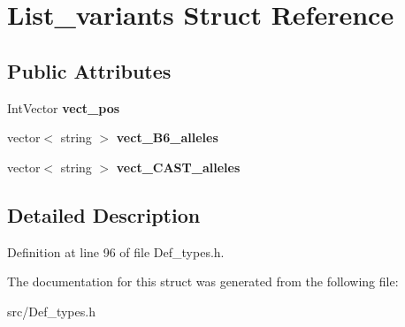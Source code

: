 \hypertarget{struct_list__variants}{}\section{List\+\_\+variants Struct Reference}
\label{struct_list__variants}
\subsection*{Public Attributes}
\begin{DoxyCompactItemize}
\item 
\mbox{\label{struct_list__variants_af4de926961aead48d57e898b475e78b1}} 
Int\+Vector {\bfseries vect\+\_\+pos}
\item 
\mbox{\label{struct_list__variants_a74d0e67c9059989e6c46e41910360b73}} 
vector$<$ string $>$ {\bfseries vect\+\_\+\+B6\+\_\+alleles}
\item 
\mbox{\label{struct_list__variants_ad924ca6d0f22ee49baa1dc939c3ddd9f}} 
vector$<$ string $>$ {\bfseries vect\+\_\+\+C\+A\+S\+T\+\_\+alleles}
\end{DoxyCompactItemize}


\subsection{Detailed Description}


Definition at line 96 of file Def\+\_\+types.\+h.



The documentation for this struct was generated from the following file\+:\begin{DoxyCompactItemize}
\item 
src/Def\+\_\+types.\+h\end{DoxyCompactItemize}
